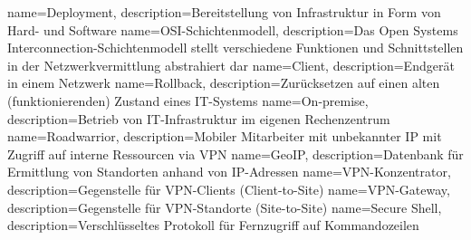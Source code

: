 {
        name=Deployment,
        description={Bereitstellung von Infrastruktur in Form von Hard- und Software}
}
{
        name=OSI-Schichtenmodell,
        description={Das Open Systems Interconnection-Schichtenmodell stellt verschiedene Funktionen und Schnittstellen in der Netzwerkvermittlung abstrahiert dar}
}
{
        name=Client,
        description={Endgerät in einem Netzwerk}
}
{
        name=Rollback,
        description={Zurücksetzen auf einen alten (funktionierenden) Zustand eines IT-Systems}
}
{
        name=On-premise,
        description={Betrieb von IT-Infrastruktur im eigenen Rechenzentrum}
}
{
        name=Roadwarrior,
        description={Mobiler Mitarbeiter mit unbekannter IP mit Zugriff auf interne Ressourcen via VPN}
}
{
        name=GeoIP,
        description={Datenbank für Ermittlung von Standorten anhand von IP-Adressen}
}
{
        name=VPN-Konzentrator,
        description=Gegenstelle für VPN-Clients (Client-to-Site)
}
{
        name=VPN-Gateway,
        description=Gegenstelle für VPN-Standorte (Site-to-Site)
}
{
        name=Secure Shell,
        description=Verschlüsseltes Protokoll für Fernzugriff auf Kommandozeilen
} 
